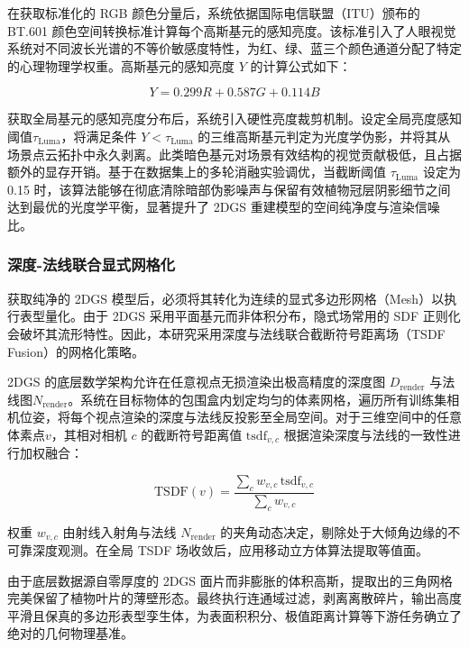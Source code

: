 \documentclass[preprint,12pt]{elsarticle}
\begin{document}
在获取标准化的 RGB 颜色分量后，系统依据国际电信联盟（ITU）颁布的 BT.601 颜色空间转换标准计算每个高斯基元的感知亮度。该标准引入了人眼视觉系统对不同波长光谱的不等价敏感度特性，为红、绿、蓝三个颜色通道分配了特定的心理物理学权重。高斯基元的感知亮度 $Y$ 的计算公式如下：

\begin{equation}
Y=0.299 R + 0.587 G + 0.114 B
\end{equation}

获取全局基元的感知亮度分布后，系统引入硬性亮度裁剪机制。设定全局亮度感知阈值${\tau}_{\mathrm{Luma}}$，将满足条件 $Y<{\tau}_{\mathrm{Luma}}$ 的三维高斯基元判定为光度学伪影，并将其从场景点云拓扑中永久剥离。此类暗色基元对场景有效结构的视觉贡献极低，且占据额外的显存开销。基于在数据集上的多轮消融实验调优，当截断阈值 ${\tau}_{\mathrm{Luma}}$ 设定为 0.15 时，该算法能够在彻底清除暗部伪影噪声与保留有效植物冠层阴影细节之间达到最优的光度学平衡，显著提升了 2DGS 重建模型的空间纯净度与渲染信噪比。

\subsubsection{深度-法线联合显式网格化}

获取纯净的 2DGS 模型后，必须将其转化为连续的显式多边形网格（Mesh）以执行表型量化。由于 2DGS 采用平面基元而非体积分布，隐式场常用的 SDF 正则化会破坏其流形特性。因此，本研究采用深度与法线联合截断符号距离场（TSDF Fusion）的网格化策略。

2DGS 的底层数学架构允许在任意视点无损渲染出极高精度的深度图 ${D}_{\mathrm{render}}$ 与法线图${N}_{\mathrm{render}}$。系统在目标物体的包围盒内划定均匀的体素网格，遍历所有训练集相机位姿，将每个视点渲染的深度与法线反投影至全局空间。对于三维空间中的任意体素点$v$，其相对相机 $c$ 的截断符号距离值 $\mathrm{tsdf}_{v,c}$ 根据渲染深度与法线的一致性进行加权融合：

\begin{equation}
\mathrm{TSDF}\left(v\right)=\frac{\sum_{c} {w}_{v,c}\,\mathrm{tsdf}_{v,c}}{\sum_{c} {w}_{v,c}}
\end{equation}

权重 ${w}_{v,c}$ 由射线入射角与法线 ${N}_{\mathrm{render}}$ 的夹角动态决定，剔除处于大倾角边缘的不可靠深度观测。在全局 TSDF 场收敛后，应用移动立方体算法提取等值面。

由于底层数据源自零厚度的 2DGS 面片而非膨胀的体积高斯，提取出的三角网格完美保留了植物叶片的薄壁形态。最终执行连通域过滤，剥离离散碎片，输出高度平滑且保真的多边形表型孪生体，为表面积积分、极值距离计算等下游任务确立了绝对的几何物理基准。
\end{document}
